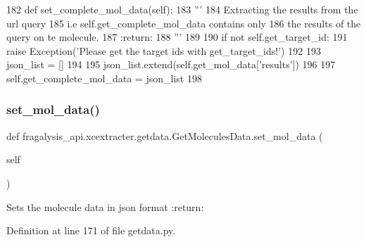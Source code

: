 \begin{DoxyCode}
182     \textcolor{keyword}{def }set\_complete\_mol\_data(self):
183         \textcolor{stringliteral}{'''}
184 \textcolor{stringliteral}{        Extracting the results from the url query}
185 \textcolor{stringliteral}{        i.e self.get\_complete\_mol\_data contains only}
186 \textcolor{stringliteral}{        the results of the query on te molecule.}
187 \textcolor{stringliteral}{        :return:}
188 \textcolor{stringliteral}{        '''}
189 
190         \textcolor{keywordflow}{if} \textcolor{keywordflow}{not} self.get\_target\_id:
191             \textcolor{keywordflow}{raise} Exception(\textcolor{stringliteral}{'Please get the target ids with get\_target\_ids!'})
192 
193         json\_list = []
194 
195         json\_list.extend(self.get\_mol\_data[\textcolor{stringliteral}{'results'}])
196 
197         self.get\_complete\_mol\_data = json\_list
198         
\end{DoxyCode}
\mbox{\label{classfragalysis__api_1_1xcextracter_1_1getdata_1_1_get_molecules_data_ab1f0b5b8edbd496d800e08c7f8758a53}} 
\subsubsection{\texorpdfstring{set\+\_\+mol\+\_\+data()}{set\_mol\_data()}}
{\footnotesize\ttfamily def fragalysis\+\_\+api.\+xcextracter.\+getdata.\+Get\+Molecules\+Data.\+set\+\_\+mol\+\_\+data (\begin{DoxyParamCaption}\item[{}]{self }\end{DoxyParamCaption})}

\begin{DoxyVerb}Sets the molecule data in json format
:return:
\end{DoxyVerb}
 

Definition at line 171 of file getdata.\+py.


